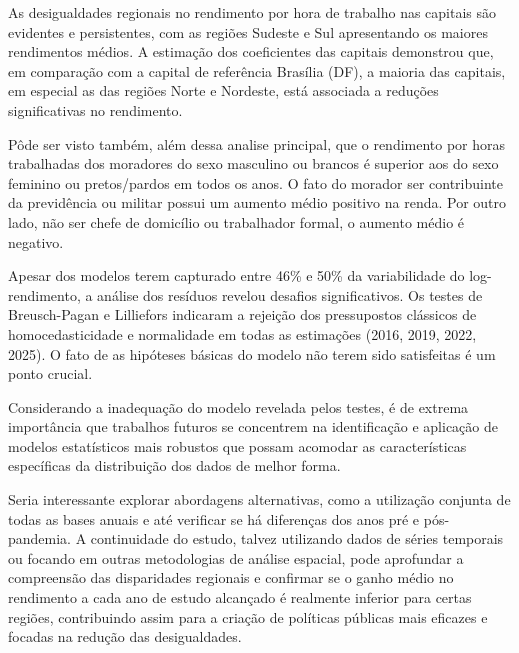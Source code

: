 \documentclass[12pt,a4paper,header]{abnt}
\begin{document}
As desigualdades regionais no rendimento por hora de trabalho nas capitais são evidentes e persistentes, com as regiões Sudeste e Sul apresentando os maiores rendimentos médios. A estimação dos coeficientes das capitais demonstrou que, em comparação com a capital de referência Brasília (DF), a maioria das capitais, em especial as das regiões Norte e Nordeste, está associada a reduções significativas no rendimento.

Pôde ser visto também, além dessa analise principal, que o rendimento por horas trabalhadas dos moradores do sexo masculino ou brancos é superior aos do sexo feminino ou pretos/pardos em todos os anos. O fato do morador ser contribuinte da previdência ou militar possui um aumento médio positivo na renda. Por outro lado, não ser chefe de domicílio ou trabalhador formal, o aumento médio é negativo.

Apesar dos modelos terem capturado entre 46\% e 50\% da variabilidade do log-rendimento, a análise dos resíduos revelou desafios significativos. Os testes de Breusch-Pagan e Lilliefors indicaram a rejeição dos pressupostos clássicos de homocedasticidade e normalidade em todas as estimações (2016, 2019, 2022, 2025). O fato de as hipóteses básicas do modelo não terem sido satisfeitas é um ponto crucial.

Considerando a inadequação do modelo revelada pelos testes, é de extrema importância que trabalhos futuros se concentrem na identificação e aplicação de modelos estatísticos mais robustos que possam acomodar as características específicas da distribuição dos dados de melhor forma.

Seria interessante explorar abordagens alternativas, como a utilização conjunta de todas as bases anuais e até verificar se há diferenças dos anos pré e pós-pandemia. A continuidade do estudo, talvez utilizando dados de séries temporais ou focando em outras metodologias de análise espacial, pode aprofundar a compreensão das disparidades regionais e confirmar se o ganho médio no rendimento a cada ano de estudo alcançado é realmente inferior para certas regiões, contribuindo assim para a criação de políticas públicas mais eficazes e focadas na redução das desigualdades.






\end{document}
